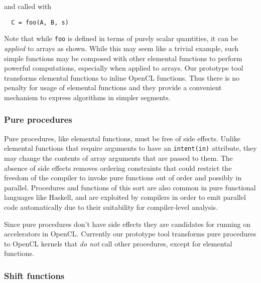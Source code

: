 \noindent and called with

{\small
\begin{verbatim}
  C = foo(A, B, s)
\end{verbatim}
}

Note that while {\tt foo} is defined in terms of purely scalar
quantities, it can be \emph{applied} to arrays as shown.  While this
may seem like a trivial example, such simple functions may be composed
with other elemental functions to perform powerful computations,
especially when applied to arrays.  Our prototype tool transforms
elemental functions to inline OpenCL functions.  Thus there is no
penalty for usage of elemental functions and they provide a convenient
mechanism to express algorithms in simpler segments.


\subsubsection*{Pure procedures}

Pure procedures, like elemental functions, must be free of side
effects.  Unlike elemental functions that require arguments to have an
{\tt intent(in)} attribute, they may change the contents of array
arguments that are passed to them.  The absence of side effects
removes ordering constraints that could restrict the freedom of the
compiler to invoke pure functions out of order and possibly in parallel.
Procedures and functions of this sort are also common in pure
functional languages like Haskell, and are exploited by compilers in
order to emit parallel code automatically due to their suitability for
compiler-level analysis.

Since pure procedures don't have side effects they are candidates for
running on accelerators in OpenCL.  Currently our prototype tool
transforms pure procedures to OpenCL kernels that \emph{do not} call
other procedures, except for elemental functions.

\subsubsection*{Shift functions}

